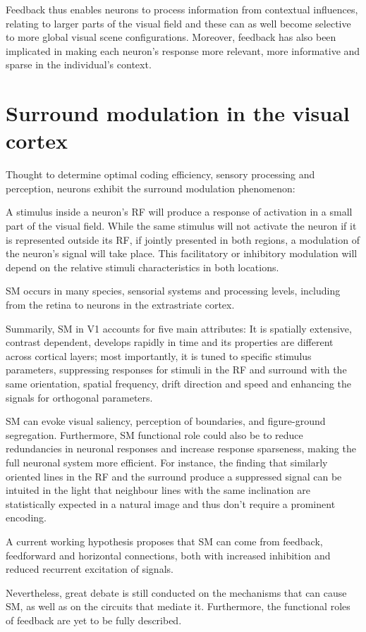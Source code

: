 Feedback thus enables neurons to process information from contextual influences, relating to larger parts of the visual field and these can as well become selective to more global visual scene configurations. Moreover, feedback has also been implicated in making each neuron's response more relevant, more informative and sparse in the individual's context.



\section{Surround modulation in the visual cortex}

Thought to determine optimal coding efficiency, sensory processing and perception, neurons exhibit the surround modulation phenomenon: 

A stimulus inside a neuron's RF will produce a response of activation in a small part of the visual field. While the same stimulus will not activate the neuron if it is represented outside its RF, if jointly presented in both regions, a modulation of the neuron's signal will take place. This facilitatory or inhibitory modulation will depend on the relative stimuli characteristics in both locations. 

SM occurs in many species, sensorial systems and processing levels, including from the retina to neurons in the extrastriate cortex. 

Summarily, SM in V1 accounts for five main attributes: It is spatially extensive, contrast dependent, develops rapidly in time and its properties are different across cortical layers; most importantly, it is tuned to specific stimulus parameters, suppressing responses for stimuli in the RF and surround with the same orientation, spatial frequency, drift direction and speed and enhancing the signals for orthogonal parameters.

SM can evoke visual saliency, perception of boundaries, and figure-ground segregation. Furthermore, SM functional role could also be to reduce redundancies in neuronal responses and increase response sparseness, making the full neuronal system more efficient. For instance, the finding that similarly oriented lines in the RF and the surround produce a suppressed signal can be intuited in the light that neighbour lines with the same inclination are statistically expected in a natural image and thus don't require a prominent encoding.

A current working hypothesis \cite{SM} proposes that SM can come from feedback, feedforward and horizontal connections, both with increased inhibition and reduced recurrent excitation of signals. 

Nevertheless, great debate is still conducted on the mechanisms that can cause SM, as well as on the circuits that mediate it. Furthermore, the functional roles of feedback are yet to be fully described.